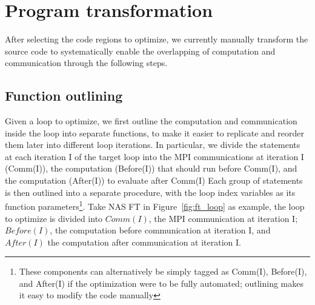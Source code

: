 \section{Program transformation}
\label{sec:cco:tune}

After selecting the code regions to optimize,
  we currently manually transform the source code to systematically
 enable the overlapping of computation and communication
through the following steps.

\subsection{Function outlining}
Given a loop to optimize, we
first outline the computation and communication inside the loop into separate functions,
to make it easier to replicate and reorder them later into different loop iterations. In particular, we divide the statements at each iteration I of the target loop into the MPI communications at iteration I (Comm(I)),
the computation  (Before(I)) that should run before Comm(I), and the computation (After(I)) to evaluate after Comm(I)
Each group of statements is then outlined into a separate procedure,  with the loop index variables as its function parameters\footnote{These components can alternatively be simply tagged as Comm(I), Before(I), and After(I) if the optimization were to be fully automated; outlining makes it easy to modify the code manually}.
Take NAS FT in Figure~\ref{fig:ft_loop} as example,  the loop to optimize is divided into
  $Comm(I)$, the MPI communication at iteration I;
  $Before(I)$, the computation before communication at iteration I,
  and $After(I)$ the computation after communication at iteration I.

